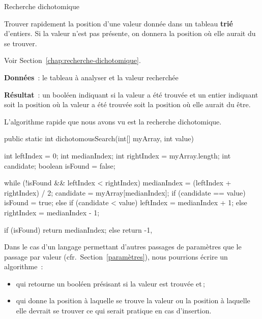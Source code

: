 \begin{Fiche}{Recherche dichotomique}
\label{fiche:dicho}


	Trouver rapidement la position d’une valeur donnée dans un tableau
	\textbf{trié} d’entiers.  Si la valeur n’est pas présente, on donnera la
	position où elle aurait du se trouver.

	Voir Section~\vref{chap:recherche-dichotomique}.

	
	\textbf{Données}~: le tableau à analyser et la valeur recherchée
		
	\textbf{Résultat}~: un booléen indiquant si la valeur a été trouvée et un
	entier indiquant soit la position où la valeur a été trouvée soit la
	position où elle aurait du être.


		L’algorithme rapide que nous avons vu est la recherche
		dichotomique.
		
		\begin{java}
public static int dichotomousSearch(int[] myArray, int value){
	int leftIndex = 0;
	int medianIndex;
	int rightIndex = myArray.length;
	int candidate;
	boolean isFound = false;

	while (!isFound && leftIndex < rightIndex){
		medianIndex = (leftIndex + rightIndex) / 2;
		candidate = myArray[medianIndex];
		if (candidate == value){
			isFound = true;
		} else if (candidate < value){
			leftIndex = medianIndex + 1;
		} else {
			rightIndex = medianIndex - 1;
		}
	}

	if (isFound){
		return medianIndex;
	} else {
		return -1,
	}
}
		\end{java}
		
		Dans le cas d'un langage permettant d'autres passages de paramètres que
		le passage par valeur (cfr.~Section~\vref{paramètres}), nous pourrions
		écrire un algorithme~:

		\begin{itemize}
			
			\item qui retourne un booléen présisant si la valeur est trouvée
				et\,;

			\item qui donne la position à laquelle se trouve la valeur ou la
				position à laquelle elle devrait se trouver ce qui serait
				pratique en cas d'insertion. 


\end{itemize}
\end{Fiche}

